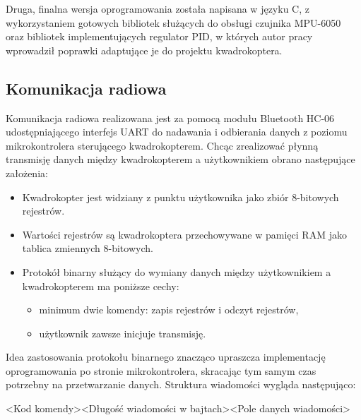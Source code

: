 Druga, finalna wersja oprogramowania została napisana w języku C, z wykorzystaniem gotowych bibliotek służących do obsługi czujnika MPU-6050 oraz bibliotek implementujących regulator PID, w których autor pracy wprowadził poprawki adaptujące je do projektu kwadrokoptera.


\subsection{Komunikacja radiowa}

Komunikacja radiowa realizowana jest za pomocą modułu Bluetooth HC-06 udostępniającego interfejs UART do nadawania i odbierania danych z poziomu mikrokontrolera sterującego kwadrokopterem.
Chcąc zrealizować płynną transmisję danych między kwadrokopterem a użytkownikiem obrano następujące założenia:
\begin{itemize}
	\item Kwadrokopter jest widziany z punktu użytkownika jako zbiór 8-bitowych rejestrów.
	\item Wartości rejestrów są kwadrokoptera przechowywane w pamięci RAM jako tablica zmiennych 8-bitowych.
	\item Protokół binarny służący do wymiany danych między użytkownikiem a kwadrokopterem ma poniższe cechy:
	\begin{itemize}
		\item minimum dwie komendy: zapis rejestrów i odczyt rejestrów,
		\item użytkownik zawsze inicjuje transmisję.
	\end{itemize} 
\end{itemize}

Idea zastosowania protokołu binarnego znacząco upraszcza implementację oprogramowania po stronie mikrokontrolera, skracając tym samym czas potrzebny na przetwarzanie danych. Struktura wiadomości wygląda następująco:

<Kod komendy><Długość wiadomości w bajtach><Pole danych wiadomości>

